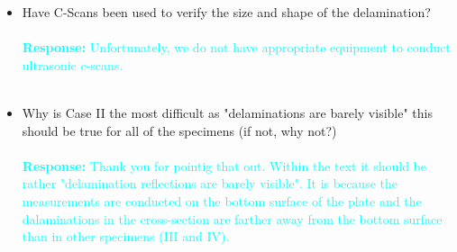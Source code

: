 \documentclass[11pt,a2paper]{report}
\begin{document}
\begin{itemize}
{		The teflon inserts were manufactured according to our specification so that their positions and sizes were known.
		The ground truths were prepared manually based on that specification.}
		\\ \\
		\item Have C-Scans been used to verify the size and shape of the delamination?
			\\ \\
		\textcolor{Cyan}{
			\textbf{Response:}
		Unfortunately, we do not have appropriate equipment to conduct ultrasonic c-scans.}
		\\ \\
		\item Why is Case II the most difficult as "delaminations are barely visible" this should be true for all of the specimens (if not, why not?)
			\\ \\
		\textcolor{Cyan}{
			\textbf{Response:}
		Thank you for pointig that out.
	    Within the text it should be rather "delamination reflections are barely visible". It is because the measurements are conducted on the bottom surface of the plate and the dalaminations in the cross-section are farther away from the bottom surface than in other specimens (III and IV).
        }
		\\ \\
	\end{itemize}
\end{document}
